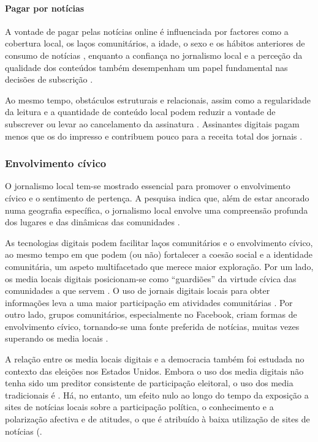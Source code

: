 \documentclass[portuguese]{textolivre}
\begin{document}
\paragraph{Pagar por notícias}
A vontade de pagar pelas notícias online é influenciada por factores como a cobertura local, os laços comunitários, a idade, o sexo e os hábitos anteriores de consumo de notícias \cite{goyanes2015}, enquanto a confiança no jornalismo local e a perceção da qualidade dos conteúdos também desempenham um papel fundamental nas decisões de subscrição \cite{park2022}.

Ao mesmo tempo, obstáculos estruturais e relacionais, assim como a regularidade da leitura e a quantidade de conteúdo local podem reduzir a vontade de subscrever ou levar ao cancelamento da assinatura \cite{ross2021, kim2021}. Assinantes digitais pagam menos que os do impresso e contribuem pouco para a receita total dos jornais \cite{chyi2020}.

\subsubsection{Envolvimento cívico}

O jornalismo local tem-se mostrado essencial para promover o envolvimento cívico e o sentimento de pertença. A pesquisa indica que, além de estar ancorado numa geografia específica, o jornalismo local envolve uma compreensão profunda dos lugares e das dinâmicas das comunidades \cite{hess2016}.

As tecnologias digitais podem facilitar laços comunitários e o envolvimento cívico, ao mesmo tempo em que podem (ou não) fortalecer a coesão social e a identidade comunitária, um aspeto multifacetado que merece maior exploração. Por um lado, os media locais digitais posicionam-se como “guardiões” da virtude cívica das comunidades a que servem \cite{hess2016}. O uso de jornais digitais locais para obter informações leva a uma maior participação em atividades comunitárias \cite{thompson2021}. Por outro lado, grupos comunitários, especialmente no Facebook, criam formas de envolvimento cívico, tornando-se uma fonte preferida de notícias, muitas vezes superando os media locais \cite{carlsson2016}.

A relação entre os media locais digitais e a democracia também foi estudada no contexto das eleições nos Estados Unidos. Embora o uso dos media digitais não tenha sido um preditor consistente de participação eleitoral, o uso dos media tradicionais é \cite{min2022}. Há, no entanto, um efeito nulo ao longo do tempo da exposição a sites de notícias locais sobre a participação política, o conhecimento e a polarização afectiva e de atitudes, o que é atribuído à baixa utilização de sites de notícias (\cite{cronin2023}.
\end{document}
